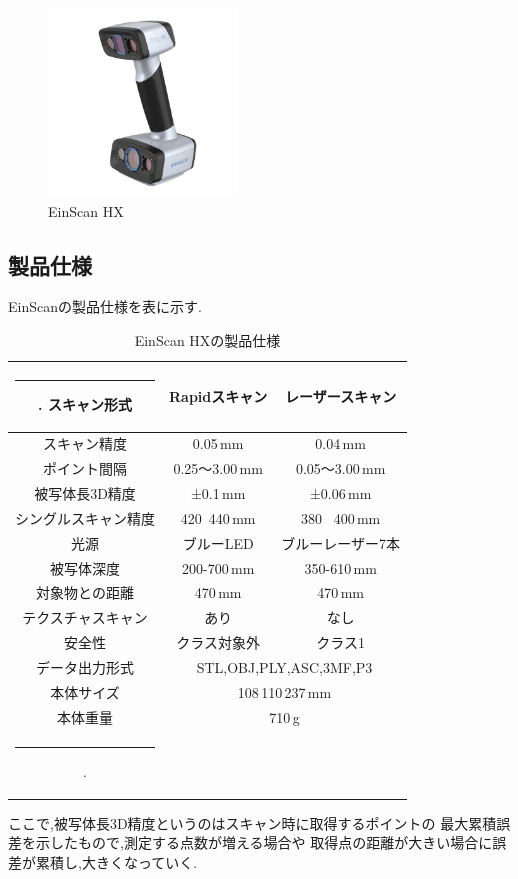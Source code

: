 \documentclass{ltjsreport}
\makeatletter
\def\Hline{
  \noalign{\ifnum0=`}\fi\hrule \@height 3.\arrayrulewidth \futurelet
  \reserved@a\@xhline}
\makeatother
\begin{document}
		\begin{figure}[H]
		\centering
		\includegraphics[width = 5cm]{../figs/EinScan.png}
		\hspace{-32truemm}
		\caption{EinScan HX}
		\label{fig:EinScan}
		\end{figure}
\vspace{-15pt}
		\subsection{製品仕様}
			EinScanの製品仕様を表に示す.
			\begin{table}[H]
			\begin{center}
			\caption{EinScan HXの製品仕様}
			\label{tab:EinScan}
			\begin{tabular}{c|cc} \Hline
				スキャン形式&Rapidスキャン&レーザースキャン\\ \hline
				スキャン精度&0.05\,mm&0.04\,mm\\
				ポイント間隔&0.25～3.00\,mm&0.05～3.00\,mm\\
				被写体長3D精度&±0.1\,mm&±0.06\,mm\\
				シングルスキャン精度&420 \times \,440\,mm&380 \times\, 400\,mm\\
				光源&ブルーLED&ブルーレーザー7本\\
				被写体深度&200-700\,mm&350-610\,mm\\
				対象物との距離&470\,mm&470\,mm\\
				テクスチャスキャン&あり&なし\\
				安全性&クラス対象外&クラス1\\ \hline
				データ出力形式&\multicolumn{2}{c}{STL,OBJ,PLY,ASC,3MF,P3}\\
				本体サイズ&\multicolumn{2}{c}{108\times\,110\times\,237\,mm}\\
				本体重量&\multicolumn{2}{c}{710\,g}\\ \Hline
			\end{tabular}
			\end{center}
			\hspace{-32truemm}
			\end{table}
			ここで,被写体長3D精度というのはスキャン時に取得するポイントの
			最大累積誤差を示したもので,測定する点数が増える場合や
			取得点の距離が大きい場合に誤差が累積し,大きくなっていく.
\end{document}

